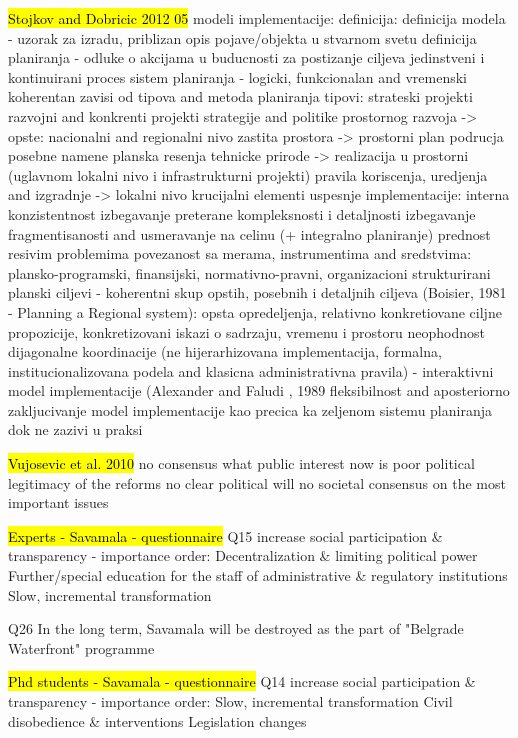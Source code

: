 \documentclass[11pt]{report}
\begin{document}
\hl{Stojkov and Dobricic 2012 05}
modeli implementacije:
definicija:
    definicija modela - uzorak za izradu, priblizan opis pojave/objekta u stvarnom svetu
    definicija planiranja - odluke o akcijama u buducnosti za postizanje ciljeva
    jedinstveni i kontinuirani proces
    sistem planiranja - logicki, funkcionalan and vremenski koherentan
    zavisi od tipova and metoda planiranja
tipovi:
    strateski projekti
    razvojni and konkrenti projekti
    strategije and politike prostornog razvoja -> opste: nacionalni and regionalni nivo
    zastita prostora -> prostorni plan podrucja posebne namene
    planska resenja tehnicke prirode -> realizacija u prostorni (uglavnom lokalni nivo i infrastrukturni projekti)
    pravila koriscenja, uredjenja and izgradnje -> lokalni nivo
krucijalni elementi uspesnje implementacije:
    interna konzistentnost
    izbegavanje preterane kompleksnosti i detaljnosti
    izbegavanje fragmentisanosti and usmeravanje na celinu (+ integralno planiranje)
    prednost resivim problemima
    povezanost sa merama, instrumentima and sredstvima: plansko-programski, finansijski, normativno-pravni, organizacioni
    strukturirani planski ciljevi - koherentni skup opstih, posebnih i detaljnih ciljeva (Boisier, 1981 - Planning a Regional system): opsta opredeljenja, relativno konkretiovane ciljne propozicije, konkretizovani iskazi o sadrzaju, vremenu i prostoru
    neophodnost dijagonalne koordinacije (ne hijerarhizovana implementacija, formalna, institucionalizovana podela and klasicna administrativna pravila) - interaktivni model implementacije (Alexander and Faludi , 1989
    fleksibilnost and aposteriorno zakljucivanje
model implementacije kao precica ka zeljenom sistemu planiranja dok ne zazivi u praksi

\hl{Vujosevic et al. 2010}
no consensus what public interest now is
    poor political legitimacy of the  reforms
    no clear political will
    no societal consensus on the most important issues
    
\hl{Experts - Savamala - questionnaire}
Q15 increase social participation \& transparency  - importance order:
Decentralization \& limiting political power
Further/special education for the staff of administrative \& regulatory institutions
Slow, incremental transformation

Q26
In the long term, Savamala will be destroyed as the part of "Belgrade Waterfront" programme

\hl{Phd students - Savamala - questionnaire}
Q14
increase social participation \& transparency  - importance order:
Slow, incremental transformation
Civil disobedience \& interventions
Legislation changes
\end{document}
